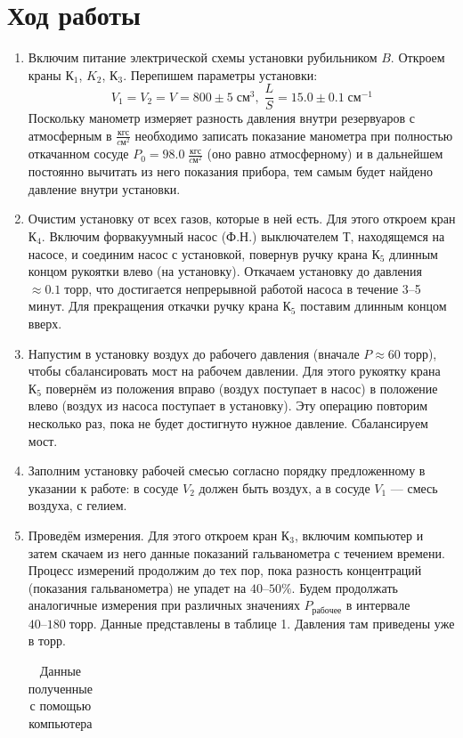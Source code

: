 \documentclass[a4paper,12pt]{article}
\begin{document}
\section{Ход работы}
\begin{enumerate}
\item Включим питание электрической схемы установки рубильником $B$. Откроем краны $К_1$, $K_2$, $К_3$. Перепишем параметры установки: $$V_1 = V_2 = V = 800 \pm 5 \; см^{3}, \; \frac{L}{S} = 15.0 \pm 0.1 \;см^{-1}$$
Поскольку манометр измеряет разность давления внутри резервуаров с атмосферным в $\frac{кгс}{cм^2}$ необходимо записать показание манометра при полностью откачанном сосуде $P_0 = 98.0 \;\frac{кгс}{cм^2}$ (оно равно атмосферному) и в дальнейшем постоянно вычитать из него показания прибора, тем самым будет найдено давление внутри установки.
\item Очистим установку от всех газов, которые в ней есть. Для этого откроем кран $К_4$. Включим форвакуумный насос (Ф.Н.) выключателем $Т$, находящемся на насосе, и соединим насос с установкой, повернув ручку крана $К_5$ длинным концом рукоятки влево (на установку). Откачаем установку до давления $\approx 0.1 \; торр $, что достигается непрерывной работой насоса в течение 3–5 минут. Для прекращения откачки ручку крана $К_5$ поставим длинным концом вверх.
\item  Напустим в установку воздух до рабочего давления (вначале $P \approx 60 \; торр$), чтобы сбалансировать мост на рабочем давлении. Для этого рукоятку крана $К_5$ повернём из положения вправо (воздух поступает в насос) в положение влево (воздух из насоса поступает в установку). Эту операцию повторим несколько раз, пока не будет достигнуто нужное давление. Сбалансируем мост.
\item Заполним установку рабочей смесью согласно порядку предложенному в указании к работе: в сосуде $V_2$ должен быть воздух, а в сосуде $V_1$ — смесь воздуха, с гелием.

\item Проведём измерения. Для этого откроем кран $К_3$, включим компьютер
и затем скачаем из него данные показаний гальванометра с течением времени. Процесс измерений продолжим до тех пор, пока разность концентраций (показания гальванометра) не упадет на $40–50\%.$ Будем продолжать аналогичные измерения при различных значениях $P_{рабочее}$ в интервале $40–180 \; торр$. Данные представлены в таблице 1. Давления там приведены уже в торр.


\begin{table}
\caption{Данные полученные с помощью компьютера}
	\begin{tabular}{|l|l|l|l|l|l|l|l|l|l|l|l|l|l|l|l|}
		\hline


\end{tabular}
\end{table}
\end{enumerate}
\end{document}

